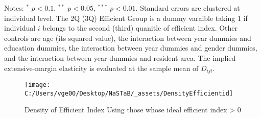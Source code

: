 \documentclass[ review  , 3p ]{elsarticle}
\begin{document}
\begin{table}
\begin{threeparttable}
  \begin{tablenotes}
  \item Notes: $^{*}$ $p < 0.1$, $^{**}$ $p < 0.05$, $^{***}$ $p < 0.01$. Standard errors are clustered at individual level. The 2Q (3Q) Efficient Group is a dummy varaible taking 1 if individual $i$ belongs to the second (third) quanitle of efficient index. Other controls are age (its squared value), the interaction between year dummies and education dummies, the interaction between year dummies and gender dummies, and the interaction between year dummies and resident area. The implied extensive-margin elasticity is evaluated at the sample mean of $D_{ijt}$.
  \end{tablenotes}
  \end{threeparttable}
  \end{table}
  
  \begin{figure}
  
  {\centering \texttt{[image: C:/Users/vge00/Desktop/NaSTaB/\_assets/DensityEfficientid]} 
  
  }
  
  \caption{Density of Efficient Index Using those whose ideal efficient index > 0}\label{fig:unnamed-chunk-2}
  \end{figure}
  
\end{document}
